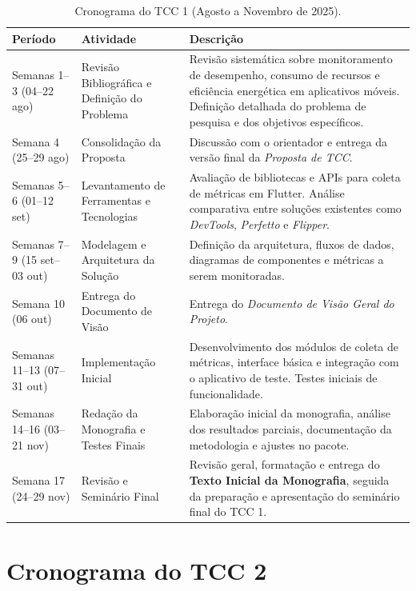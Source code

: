 \begin{table}[htbp]
\centering
\caption{Cronograma do TCC 1 (Agosto a Novembro de 2025).}
\label{tab:cronograma-tcc1}
\small
\renewcommand{\arraystretch}{1.25}
\begin{tabular}{|p{2.7cm}|p{4.5cm}|p{6.3cm}|}
\hline
\textbf{Período} & \textbf{Atividade} & \textbf{Descrição} \\
\hline
Semanas 1--3 (04--22 ago) & Revisão Bibliográfica e Definição do Problema & Revisão sistemática sobre monitoramento de desempenho, consumo de recursos e eficiência energética em aplicativos móveis. Definição detalhada do problema de pesquisa e dos objetivos específicos. \\
\hline
Semana 4 (25--29 ago) & Consolidação da Proposta & Discussão com o orientador e entrega da versão final da \textit{Proposta de TCC}. \\
\hline
Semanas 5--6 (01--12 set) & Levantamento de Ferramentas e Tecnologias & Avaliação de bibliotecas e APIs para coleta de métricas em Flutter. Análise comparativa entre soluções existentes como \textit{DevTools}, \textit{Perfetto} e \textit{Flipper}. \\
\hline
Semanas 7--9 (15 set--03 out) & Modelagem e Arquitetura da Solução & Definição da arquitetura, fluxos de dados, diagramas de componentes e métricas a serem monitoradas. \\
\hline
Semana 10 (06 out) & Entrega do Documento de Visão & Entrega do \textit{Documento de Visão Geral do Projeto}. \\
\hline
Semanas 11--13 (07--31 out) & Implementação Inicial & Desenvolvimento dos módulos de coleta de métricas, interface básica e integração com o aplicativo de teste. Testes iniciais de funcionalidade. \\
\hline
Semanas 14--16 (03--21 nov) & Redação da Monografia e Testes Finais & Elaboração inicial da monografia, análise dos resultados parciais, documentação da metodologia e ajustes no pacote. \\
\hline
Semana 17 (24--29 nov) & Revisão e Seminário Final & Revisão geral, formatação e entrega do \textbf{Texto Inicial da Monografia}, seguida da preparação e apresentação do seminário final do TCC 1. \\
\hline
\end{tabular}
\end{table}

\section{Cronograma do TCC 2}


